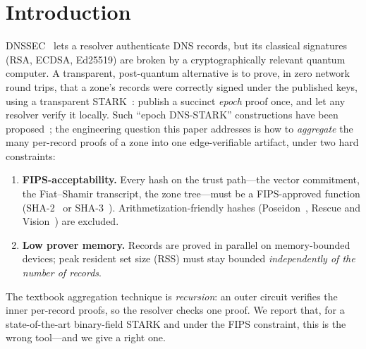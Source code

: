 \documentclass[11pt]{article}
\begin{document}
\section{Introduction}

DNSSEC~\cite{dnssec} lets a resolver authenticate DNS records, but its classical
signatures (RSA, ECDSA, Ed25519) are broken by a cryptographically relevant
quantum computer. A transparent, post-quantum alternative is to prove, in zero
network round trips, that a zone's records were correctly signed under the
published keys, using a transparent STARK~\cite{stark}: publish a succinct
\emph{epoch} proof once, and let any resolver verify it locally. Such ``epoch
DNS-STARK'' constructions have been proposed~\cite{epochdnsstark}; the
engineering question this paper addresses is how to \emph{aggregate} the many
per-record proofs of a zone into one edge-verifiable artifact, under two hard
constraints:
\begin{enumerate}[nosep,leftmargin=*]
  \item \textbf{FIPS-acceptability.} Every hash on the trust path---the vector
  commitment, the Fiat--Shamir transcript, the zone tree---must be a
  FIPS-approved function (SHA-2~\cite{fips1804} or SHA-3~\cite{fips202}).
  Arithmetization-friendly hashes (Poseidon~\cite{poseidon}, Rescue and
  Vision~\cite{marvellous}) are excluded.
  \item \textbf{Low prover memory.} Records are proved in parallel on
  memory-bounded devices; peak resident set size (RSS) must stay bounded
  \emph{independently of the number of records}.
\end{enumerate}

The textbook aggregation technique is \emph{recursion}: an outer circuit verifies
the inner per-record proofs, so the resolver checks one proof. We report that,
for a state-of-the-art binary-field STARK and under the FIPS constraint, this is
the wrong tool---and we give a right one.
\end{document}
